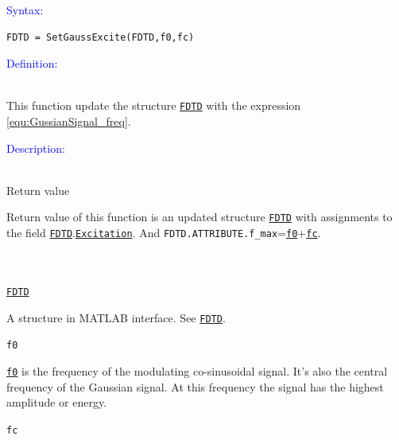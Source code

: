 \textcolor{blue}{\begin{large}Syntax:\end{large}}
 \begin{lstlisting}
FDTD = SetGaussExcite(FDTD,f0,fc)
 \end{lstlisting}

\textcolor{blue}{\begin{large}Definition:\end{large}}\\
      This function update the structure \hyperref[para:FDTD]{\texttt{FDTD}} with the expression \ref{equ:GussianSignal_freq}. 

\textcolor{blue}{\begin{large}Description:\end{large}}\\
	      Return value 
	\begin{myindentpar}
      Return value of this function is an updated structure \hyperref[para:FDTD]{\texttt{FDTD}} with assignments to the field \hyperref[para:FDTD]{\texttt{FDTD}}.\hyperref[para:Excitation]{\texttt{Excitation}}. And \texttt{FDTD.ATTRIBUTE.f\_max}=\hyperref[para:f0]{\texttt{f0}}+\hyperref[para:fc]{\texttt{fc}}.
      \end{myindentpar}
	      \\ \\
	\hyperref[para:FDTD]{\texttt{FDTD}} 
	    \begin{myindentpar}
		A structure in MATLAB interface. See \hyperref[para:FDTD]{\texttt{FDTD}}.
	    \end{myindentpar}
	\texttt{f0}   \label{para:f0} %
	    \begin{myindentpar}
		\hyperref[para:f0]{\texttt{f0}}  is the frequency of the modulating co-sinusoidal signal. It's also the central frequency of the Gaussian signal. At this frequency the signal has the highest amplitude or energy. 
	    \end{myindentpar}
	\texttt{fc}   \label{para:fc} %
